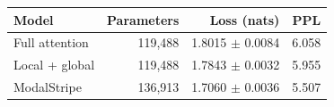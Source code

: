 \begin{tabular}{lrrr}\toprule
Model & Parameters & Loss (nats) & PPL\\\midrule
Full attention & 119,488 & 1.8015 $\pm$ 0.0084 & 6.058 \\
Local + global & 119,488 & 1.7843 $\pm$ 0.0032 & 5.955 \\
ModalStripe & 136,913 & 1.7060 $\pm$ 0.0036 & 5.507 \\
\bottomrule\end{tabular}
